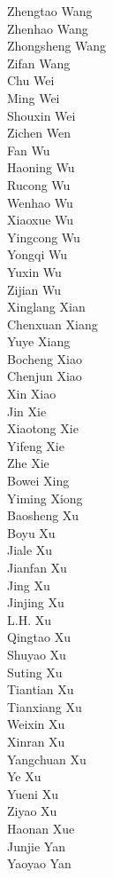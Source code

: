 Zhengtao Wang\\
Zhenhao Wang\\
Zhongsheng Wang\\
Zifan Wang\\
Chu Wei\\
Ming Wei\\
Shouxin Wei\\
Zichen Wen\\
Fan Wu\\
Haoning Wu\\
Rucong Wu\\
Wenhao Wu\\
Xiaoxue Wu\\
Yingcong Wu\\
Yongqi Wu\\
Yuxin Wu\\
Zijian Wu\\
Xinglang Xian\\
Chenxuan Xiang\\
Yuye Xiang\\
Bocheng Xiao\\
Chenjun Xiao\\
Xin Xiao\\
Jin Xie\\
Xiaotong Xie\\
Yifeng Xie\\
Zhe Xie\\
Bowei Xing\\
Yiming Xiong\\
Baosheng Xu\\
Boyu Xu\\
Jiale Xu\\
Jianfan Xu\\
Jing Xu\\
Jinjing Xu\\
L.H. Xu\\
Qingtao Xu\\
Shuyao Xu\\
Suting Xu\\
Tiantian Xu\\
Tianxiang Xu\\
Weixin Xu\\
Xinran Xu\\
Yangchuan Xu\\
Ye Xu\\
Yueni Xu\\
Ziyao Xu\\
Haonan Xue\\
Junjie Yan\\
Yaoyao Yan\\
